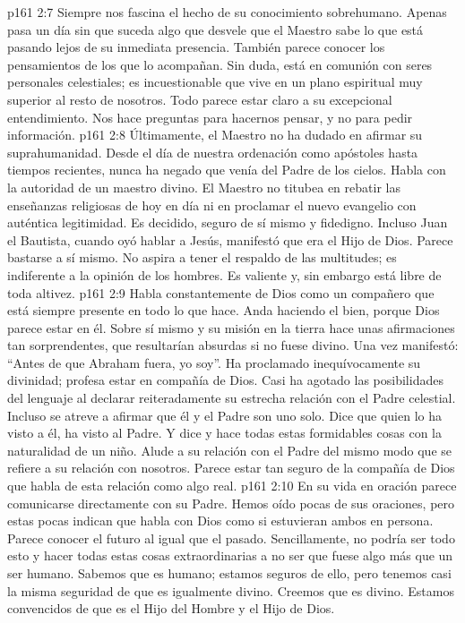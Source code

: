 \vs p161 2:7 Siempre nos fascina el hecho de su conocimiento sobrehumano. Apenas pasa un día sin que suceda algo que desvele que el Maestro sabe lo que está pasando lejos de su inmediata presencia. También parece conocer los pensamientos de los que lo acompañan. Sin duda, está en comunión con seres personales celestiales; es incuestionable que vive en un plano espiritual muy superior al resto de nosotros. Todo parece estar claro a su excepcional entendimiento. Nos hace preguntas para hacernos pensar, y no para pedir información.
\vs p161 2:8 Últimamente, el Maestro no ha dudado en afirmar su suprahumanidad. Desde el día de nuestra ordenación como apóstoles hasta tiempos recientes, nunca ha negado que venía del Padre de los cielos. Habla con la autoridad de un maestro divino. El Maestro no titubea en rebatir las enseñanzas religiosas de hoy en día ni en proclamar el nuevo evangelio con auténtica legitimidad. Es decidido, seguro de sí mismo y fidedigno. Incluso Juan el Bautista, cuando oyó hablar a Jesús, manifestó que era el Hijo de Dios. Parece bastarse a sí mismo. No aspira a tener el respaldo de las multitudes; es indiferente a la opinión de los hombres. Es valiente y, sin embargo está libre de toda altivez.
\vs p161 2:9 Habla constantemente de Dios como un compañero que está siempre presente en todo lo que hace. Anda haciendo el bien, porque Dios parece estar en él. Sobre sí mismo y su misión en la tierra hace unas afirmaciones tan sorprendentes, que resultarían absurdas si no fuese divino. Una vez manifestó: “Antes de que Abraham fuera, yo soy”. Ha proclamado inequívocamente su divinidad; profesa estar en compañía de Dios. Casi ha agotado las posibilidades del lenguaje al declarar reiteradamente su estrecha relación con el Padre celestial. Incluso se atreve a afirmar que él y el Padre son uno solo. Dice que quien lo ha visto a él, ha visto al Padre. Y dice y hace todas estas formidables cosas con la naturalidad de un niño. Alude a su relación con el Padre del mismo modo que se refiere a su relación con nosotros. Parece estar tan seguro de la compañía de Dios que habla de esta relación como algo real.
\vs p161 2:10 En su vida en oración parece comunicarse directamente con su Padre. Hemos oído pocas de sus oraciones, pero estas pocas indican que habla con Dios como si estuvieran ambos en persona. Parece conocer el futuro al igual que el pasado. Sencillamente, no podría ser todo esto y hacer todas estas cosas extraordinarias a no ser que fuese algo más que un ser humano. Sabemos que es humano; estamos seguros de ello, pero tenemos casi la misma seguridad de que es igualmente divino. Creemos que es divino. Estamos convencidos de que es el Hijo del Hombre y el Hijo de Dios.
